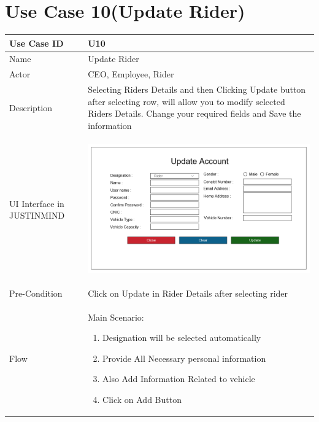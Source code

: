 \documentclass[12pt,a4paper]{report}
\begin{document}
\section{ Use Case 10(Update Rider)}

\begin{tabular}{ | m{3cm} | m{12cm}| } \hline

Use Case ID &  U10 \\\hline

Name  	    &  Update Rider \\ \hline

Actor     	& CEO, Employee, Rider \\ \hline

Description & Selecting Riders Details and then Clicking Update button after selecting row, will allow you to modify selected Riders Details. Change your required fields and Save the information \\ \hline

UI Interface in JUSTINMIND & \begin{center} \includegraphics[scale=0.3]{./UIs for Latex Reports/UI-021 UpdateRider@1x.png}\end{center}  \\ \hline

Pre-Condition &  Click on Update in Rider Details after selecting rider \\ \hline

Flow & Main Scenario:

\begin{enumerate}
\item   Designation will be selected automatically
\item  Provide All Necessary personal information
\item  Also Add Information Related to vehicle
\item  Click on Add Button



\end{enumerate}
\end{tabular}
\end{document}
